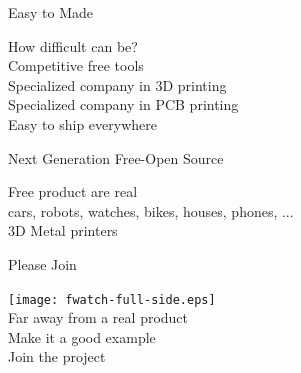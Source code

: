 \documentclass[compress,red]{beamer}
\begin{document}

\begin{frame}{Easy to Made}
  \Large
  \begin{center}
    How difficult can be? \\
    \vskip 1cm
    Competitive free tools \\
    \vskip 1cm
    Specialized company in 3D printing \\
    \vskip 1cm
    Specialized company in PCB printing \\
    \vskip 1cm
    Easy to ship everywhere
 \end{center}

\end{frame}


\begin{frame}{Next Generation Free-Open Source}
  \Large
  \begin{center}
    Free product are real \\
    \vskip 1cm
    cars, robots, watches, bikes, houses, phones, ... \\
    \vskip 1cm
    3D Metal printers \\
  \end{center}

\end{frame}


\begin{frame}{Please Join}
  \Large
  \begin{center}
    \texttt{[image: fwatch-full-side.eps]} \\
    \vskip 5mm
    Far away from a real product \\
    \vskip 5mm
    Make it a good example \\
    \vskip 5mm
    Join the project \\
  \end{center}

\end{frame}

\end{document}
